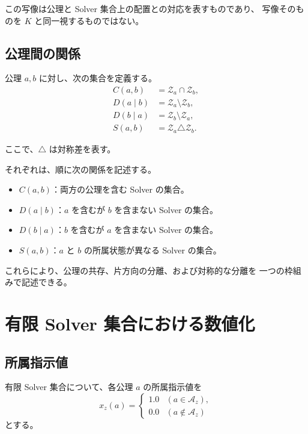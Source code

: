 \documentclass[a4paper,11pt]{ltjsarticle}
\begin{document}
この写像は公理と Solver 集合上の配置との対応を表すものであり、
写像そのものを $K$ と同一視するものではない。

\subsection{公理間の関係}

公理 $a,b$ に対し、次の集合を定義する。
\begin{align}
  C(a,b)
  &=\mathcal{Z}_a\cap\mathcal{Z}_b,\\
  D(a\mid b)
  &=\mathcal{Z}_a\setminus\mathcal{Z}_b,\\
  D(b\mid a)
  &=\mathcal{Z}_b\setminus\mathcal{Z}_a,\\
  S(a,b)
  &=\mathcal{Z}_a\triangle\mathcal{Z}_b.
\end{align}

ここで、$\triangle$ は対称差を表す。

それぞれは、順に次の関係を記述する。

\begin{itemize}
  \item $C(a,b)$：両方の公理を含む Solver の集合。
  \item $D(a\mid b)$：$a$ を含むが $b$ を含まない Solver の集合。
  \item $D(b\mid a)$：$b$ を含むが $a$ を含まない Solver の集合。
  \item $S(a,b)$：$a$ と $b$ の所属状態が異なる Solver の集合。
\end{itemize}

これらにより、公理の共存、片方向の分離、および対称的な分離を
一つの枠組みで記述できる。

\section{有限 Solver 集合における数値化}

\subsection{所属指示値}

有限 Solver 集合について、各公理 $a$ の所属指示値を
\begin{equation}
  x_z(a)=
  \begin{cases}
    1.0 & (a\in\mathcal{A}_z),\\
    0.0 & (a\notin\mathcal{A}_z)
  \end{cases}
\end{equation}
とする。
\end{document}
